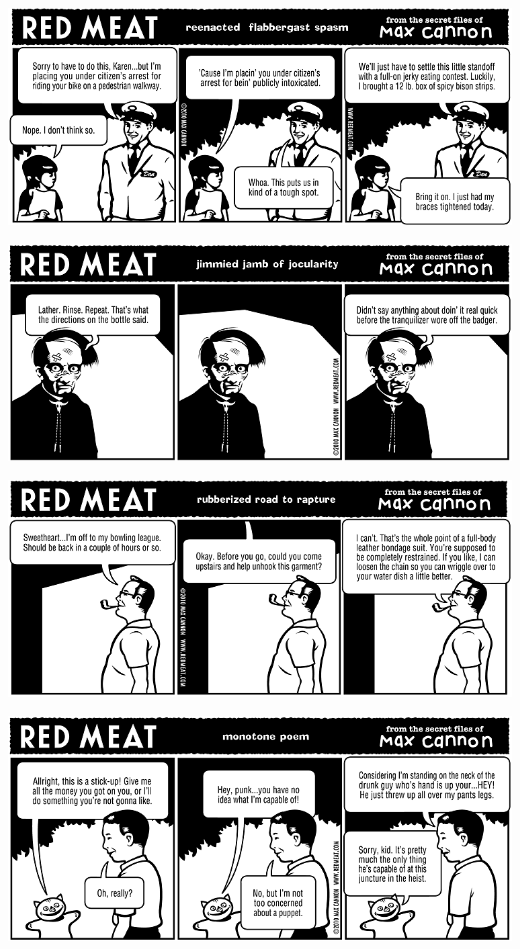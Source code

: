 \documentclass[a4paper,twoside,11pt]{article}
\begin{document}
\includegraphics[width=\textwidth]{redmeat_2010-10-19.png}



\includegraphics[width=\textwidth]{redmeat_2010-10-26.png}



\includegraphics[width=\textwidth]{redmeat_2010-11-02.png}



\includegraphics[width=\textwidth]{redmeat_2010-11-09.png}
\end{document}

